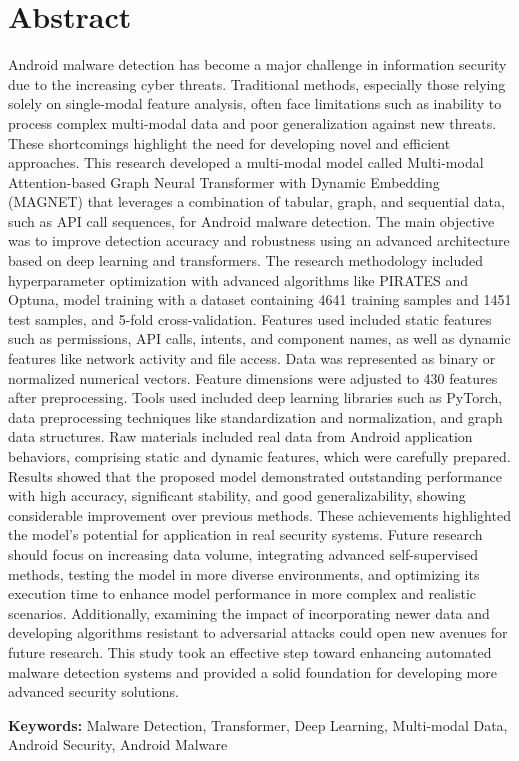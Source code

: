 \chapter*{\vspace{-3cm}\fontsize{14}{15}\selectfont Abstract}
\thispagestyle{empty}
\vspace{-1.5cm}\setlength{\parindent}{20pt}\fontsize{12}{13}\selectfont
Android malware detection has become a major challenge in information security due to the increasing cyber threats. Traditional methods, especially those relying solely on single-modal feature analysis, often face limitations such as inability to process complex multi-modal data and poor generalization against new threats. These shortcomings highlight the need for developing novel and efficient approaches. This research developed a multi-modal model called Multi-modal Attention-based Graph Neural Transformer with Dynamic Embedding (MAGNET) that leverages a combination of tabular, graph, and sequential data, such as API call sequences, for Android malware detection. The main objective was to improve detection accuracy and robustness using an advanced architecture based on deep learning and transformers. The research methodology included hyperparameter optimization with advanced algorithms like PIRATES and Optuna, model training with a dataset containing 4641 training samples and 1451 test samples, and 5-fold cross-validation. Features used included static features such as permissions, API calls, intents, and component names, as well as dynamic features like network activity and file access. Data was represented as binary or normalized numerical vectors. Feature dimensions were adjusted to 430 features after preprocessing. Tools used included deep learning libraries such as PyTorch, data preprocessing techniques like standardization and normalization, and graph data structures. Raw materials included real data from Android application behaviors, comprising static and dynamic features, which were carefully prepared. Results showed that the proposed model demonstrated outstanding performance with high accuracy, significant stability, and good generalizability, showing considerable improvement over previous methods. These achievements highlighted the model's potential for application in real security systems. Future research should focus on increasing data volume, integrating advanced self-supervised methods, testing the model in more diverse environments, and optimizing its execution time to enhance model performance in more complex and realistic scenarios. Additionally, examining the impact of incorporating newer data and developing algorithms resistant to adversarial attacks could open new avenues for future research. This study took an effective step toward enhancing automated malware detection systems and provided a solid foundation for developing more advanced security solutions.

\par\vspace{.5cm}\setlength{\parindent}{0pt}
\textbf{Keywords:} Malware Detection, Transformer, Deep Learning, Multi-modal Data, Android Security, Android Malware
